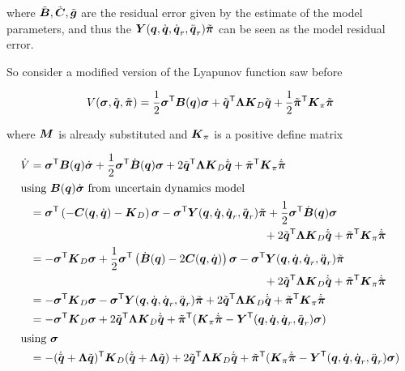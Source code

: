 where $\tilde{\boldsymbol{B}}, \tilde{\boldsymbol{C}}, \tilde{\boldsymbol{g}}$ are the residual error given by the estimate of the model parameters, and thus the $\boldsymbol{Y} (\boldsymbol{q},\dot{\boldsymbol{q}},\dot{\boldsymbol{q}}_r,\ddot{\boldsymbol{q}}_r)\tilde{\boldsymbol{\pi}}$ can be seen as the model residual error.

So consider a modified version of the Lyapunov function saw before

\[
	V(\boldsymbol{\sigma}, \tilde{\boldsymbol{q}}, \tilde{\boldsymbol{\pi}}) = \frac{1}{2} \boldsymbol{\sigma}^{\mathsf{T}} \boldsymbol{B}(\boldsymbol{q}) \boldsymbol{\sigma} + \tilde{\boldsymbol{q}}^{\mathsf{T}} \boldsymbol{\Lambda} \boldsymbol{K}_D \tilde{\boldsymbol{q}} + \frac{1}{2} \tilde{\boldsymbol{\pi}}^{\mathsf{T}} \boldsymbol{K}_\pi \tilde{\boldsymbol{\pi}}
\]

where $\boldsymbol{M}$ is already substituted and $\boldsymbol{K}_\pi$ is a positive define matrix

\begin{align*}
    \dot V &= \vect\sigma^\trans \B(\q) \dot{\vect\sigma} + \frac{1}{2} \vect\sigma^\trans \dB(\q) \vect\sigma +
    2 \qe^\trans \matr\Lambda \K_D \dqe + \error{\vect\pi}^\trans \K_\pi \dot{\error{\vect\pi}} \\
    \intertext{using $\B(\q) \dot{\vect\sigma}$ from uncertain dynamics model}
    &= \vect\sigma^\trans \left( - \matr{C}(\q,\dq)  - \K_D \right) \vect\sigma - \vect\sigma^\trans \matr Y (\q,\dq,\dq_r,\ddq_r)\error{\vect\pi}
    + \frac{1}{2} \vect\sigma^\trans \dB(\q) \vect\sigma \\ & \hspace{0.6\textwidth}
    + 2 \qe^\trans \matr\Lambda \K_D \dqe + \error{\vect\pi}^\trans \K_\pi \dot{\error{\vect\pi}} \\
    &= - \vect\sigma^\trans \K_D \vect\sigma + \frac{1}{2} \vect\sigma^\trans \left( \dB(\q) - 2 \matr{C}(\q,\dq)\right) \vect\sigma
    - \vect\sigma^\trans \matr Y (\q,\dq,\dq_r,\ddq_r)\error{\vect\pi}  \\ & \hspace{0.6\textwidth}
    + 2 \qe^\trans \matr\Lambda \K_D \dqe + \error{\vect\pi}^\trans \K_\pi \dot{\error{\vect\pi}} \\
    &= - \vect\sigma^\trans \K_D \vect\sigma
    - \vect\sigma^\trans \matr Y (\q,\dq,\dq_r,\ddq_r)\error{\vect\pi} + 2 \qe^\trans \matr\Lambda \K_D \dqe + \error{\vect\pi}^\trans \K_\pi \dot{\error{\vect\pi}} \\
    &= - \vect\sigma^\trans \K_D \vect\sigma
     + 2 \qe^\trans \matr\Lambda \K_D \dqe + \error{\vect\pi}^\trans (\K_\pi \dot{\error{\vect\pi}} -  \matr Y^\trans (\q,\dq,\dq_r,\ddq_r) \vect\sigma) \\
    \intertext{using $\vect\sigma$}
    &= - (\dqe + \matr\Lambda\qe)^\trans \K_D (\dqe + \matr\Lambda\qe)
    + 2 \qe^\trans \matr\Lambda \K_D \dqe + \error{\vect\pi}^\trans (\K_\pi \dot{\error{\vect\pi}} -  \matr Y^\trans (\q,\dq,\dq_r,\ddq_r) \vect\sigma) \\

\end{align*}
